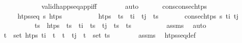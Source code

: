 \begin{isabellebody}
\ \ \ \ \ \ \ \ \ \ \ \ valid{\isacharunderscore}{\kern0pt}happ{\isacharunderscore}{\kern0pt}seq{\isacharunderscore}{\kern0pt}app{\isacharunderscore}{\kern0pt}iff\isanewline
\ \ \ \ \ \ \isamarkupfalse%
\ auto\isanewline
\ \ \isamarkupfalse%
%
\endisatagproof
{\isafoldproof}%
%
\isadelimproof
\isanewline
%
\endisadelimproof
\isanewline
\isanewline
\ \ \isamarkupfalse%
\ cons{\isacharunderscore}{\kern0pt}consec{\isacharunderscore}{\kern0pt}htps{\isacharcolon}{\kern0pt}\isanewline
\ \ \ \ \ {\isachardoublequoteopen}htps{\isacharunderscore}{\kern0pt}seq\ {\isasympi}s\ htps{\isachardoublequoteclose}\ \isanewline
\ \ \ \ \ \ \ \ \ {\isachardoublequoteopen}htps\ {\isacharequal}{\kern0pt}\ ts\ {\isacharat}{\kern0pt}\ t\isactrlsub i\ {\isacharhash}{\kern0pt}\ t\isactrlsub j\ {\isacharhash}{\kern0pt}\ ts\isanewline
\ \ \ \ \ \ \ {\isachardoublequoteopen}consec{\isacharunderscore}{\kern0pt}htps\ {\isasympi}s\ t\isactrlsub i\ t\isactrlsub j{\isachardoublequoteclose}\isanewline
%
\isadelimproof
\ \ %
\endisadelimproof
%
\isatagproof
{}\isamarkupfalse%
\ {\isacharminus}{\kern0pt}\isanewline
\ \ \ \ \isamarkupfalse%
\ ts{\isacharprime}{\kern0pt}\ \ {\isachardoublequoteopen}htps\ {\isacharequal}{\kern0pt}\ ts\ {\isacharat}{\kern0pt}\ t\isactrlsub i\ {\isacharhash}{\kern0pt}\ ts{\isacharprime}{\kern0pt}\ {\isacharat}{\kern0pt}\ t\isactrlsub j\ {\isacharhash}{\kern0pt}\ ts\ \ {\isachardoublequoteopen}ts{\isacharprime}{\kern0pt}\ {\isacharequal}{\kern0pt}\ {\isacharbrackleft}{\kern0pt}{\isacharbrackright}{\kern0pt}{\isachardoublequoteclose}\isanewline
\ \ \ \ \ \ \isamarkupfalse%
\ assms\ \isamarkupfalse%
\ auto\isanewline
\ \ \ \ \isamarkupfalse%
\ \isamarkupfalse%
\ {\isachardoublequoteopen}{\isasymforall}t\ {\isasymin}\ set\ htps{\isachardot}{\kern0pt}\ t\isactrlsub i\ {\isacharless}{\kern0pt}\ t\ {\isasymand}\ t\ {\isacharless}{\kern0pt}\ t\isactrlsub j\ {\isasymlongrightarrow}\ t\ {\isasymin}\ set\ ts{\isacharprime}{\kern0pt}{\isachardoublequoteclose}\isanewline
\ \ \ \ \ \ \isamarkupfalse%
\ assms\ \isamarkupfalse%
\ htps{\isacharunderscore}{\kern0pt}seq{\isacharunderscore}{\kern0pt}def\ \isamarkupfalse%

\end{isabellebody}
